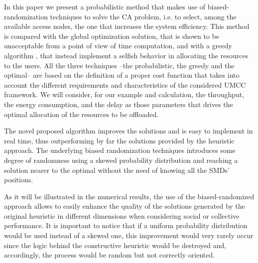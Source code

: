 \documentclass[twoside,openright]{report}
\begin{document}
In this paper we present a probabilistic method that makes use of biased-randomization techniques to solve the \gls{CA} problem, i.e. to select, among the available access nodes, the one that increases the system efficiency. This method is compared with the global optimization solution, that is shown to be unacceptable from a point of view of time computation, and with a greedy algorithm \cite{Globecom2014}, that instead implement a selfish behavior in allocating the resources to the users.    
All the three techniques --the probabilistic, the greedy and the optimal-- are based on the definition of a proper cost function that takes into account the different requirements and characteristics of the considered \gls{UMCC} framework. We will consider, for our example and calculation, the  throughput, the energy consumption, and the delay as those parameters that drives the optimal allocation of the resources to be offloaded.

The novel proposed algorithm improves the solutions and is easy to implement in real time, thus outperforming by far the solutions provided by the heuristic approach. The underlying biased randomization techniques \cite{Juan2011} introduces some degree of randomness using a skewed probability distribution and reaching a solution nearer to the optimal without the need of knowing all the \glspl{SMD}' positions.

As it will be illustrated in the numerical results, the use of the biased-randomized approach allows to easily enhance the quality of the solutions generated by the original heuristic in different dimensions when considering social or collective performance. 
It is important to notice that if a uniform probability distribution would be used instead of a skewed one, this improvement would very rarely occur since the logic behind the constructive heuristic would be destroyed and, accordingly, the process would be random but not correctly oriented.
\end{document}
